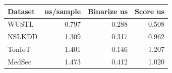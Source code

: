 \begin{tabular}{lrrr}
\toprule
Dataset & us/sample & Binarize us & Score us \\
\midrule
WUSTL & 0.797 & 0.288 & 0.508 \\
NSLKDD & 1.309 & 0.317 & 0.962 \\
TonIoT & 1.401 & 0.146 & 1.207 \\
MedSec & 1.473 & 0.412 & 1.020 \\
\bottomrule
\end{tabular}
